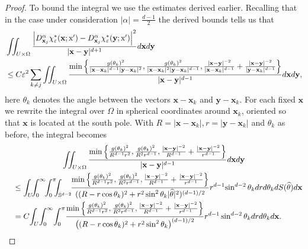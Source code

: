 \documentclass[10pt]{amsart}
\theoremstyle{definition}\newtheorem{defi}[theo]{Definition}\newtheorem{rema}[theo]{Remark}\newtheorem{exam}[theo]{Example}\newtheorem{exem}[theo]{Example}\newtheorem{nota}[theo]{Notation}
\newcommand*\eps{\varepsilon}
\renewcommand*\S {\mathbb{S}}
\newcommand\1{{\ensuremath {\mathds 1} }}
\newcommand{\bx}{\mathbf{x}}
\newcommand{\by}{\mathbf{y}}
\newcommand{\sx}{\textup{x}}
\renewcommand*{\hat}[1]{\mathchoice{\widehat{#1}}{\widehat{#1}}{\oldhat{#1}}{\oldhat{#1}}}\let\oldforall\forall
\renewcommand*{\forall}{\mathrel{\oldforall}}
\begin{document}
\begin{proof}
To bound the integral we use the estimates derived earlier. Recalling that in the case under consideration $|\alpha|= \frac{d-1}{2}$ the derived bounds tells us that
\begin{align*}
&\iint_{U\times \Omega}\frac{\left|D_{\bx_j}^\alpha\chi_\eps^*(\bx; \sx')-D_{\bx_j}^\alpha\chi_\eps^*(\by; \sx')\right|^2}{|\bx-\by|^{d+1}}d\bx d\by\\
&\leq C \eps^2\sum_{k\neq j}
\iint_{U\times \Omega}
\frac{\min\left\{
\frac{g(\theta_k)^{2}}{|\bx-\bx_k|^{d-1}|\by-\bx_k|^{2}},
\frac{g(\theta_k)^{2}}{|\bx-\bx_k|^{2}|\by-\bx_k|^{d-1}},
\frac{|\bx-\by|^{-2}}{|\bx-\bx_k|^{d-1}} +\frac{|\bx-\by|^{-2}}{|\by-\bx_k|^{d-1}}\right\}}{|\bx-\by|^{d-1}}d\bx d\by,
\end{align*}
here $\theta_k$ denotes the angle between the vectors $\bx-\bx_k$ and $\by-\bx_k$. For each fixed $\bx$ we rewrite the integral over $\Omega$ in spherical coordinates around $\bx_k$, oriented so that $\bx$ is located at the south pole. With $R=|\bx-\bx_k|, r=|\by-\bx_k|$ and $\theta_k$ as before, the integral becomes
\begin{multline*}
\iint_{U\times\Omega}\frac{\min\left\{
\frac{g(\theta_k)^{2}}{R^{d-1}r^{2}},
\frac{g(\theta_k)^{2}}{R^{2}r^{d-1}},
\frac{|\bx-\by|^{-2}}{R^{d-1}}+
\frac{|\bx-\by|^{-2}}{r^{d-1}}\right\}}{|\bx-\by|^{d-1}}d\bx d\by\\
\begin{aligned}
&\quad\leq
\int_U\!\!\int_0^{\infty}\!\!\int_0^\pi\!\!\!\int_{\S^{d-2}}
\!\!\frac{
\min\left\{
\frac{g(\theta_k)^{2}}{R^{d-1}r^{2}},
\frac{g(\theta_k)^{2}}{R^{2}r^{d-1}},
\frac{|\bx-\by|^{-2}}{R^{d-1}} +\frac{|\bx-\by|^{-2}}{r^{d-1}}
\right\}} {((R-r \cos\theta_k)^2+r^2\sin^2 \theta_k |\hat\theta|^2)^{(d-1)/2}} r^{d-1}\!\sin^{d-2}\theta_k dr d\theta_k d S(\hat\theta) d\bx\\
&\quad= C\!\int_U\!\int_0^{\infty}\!\int_0^\pi\!
\frac{
\min\left\{
\frac{g(\theta_k)^{2}}{R^{d-1}r^{2}},
\frac{g(\theta_k)^{2}}{R^{2}r^{d-1}},
\frac{|\bx-\by|^{-2}}{R^{d-1}}+
\frac{|\bx-\by|^{-2}}{r^{d-1}}
\right\}} {\left((R-r \cos\theta_k)^2+r^2\sin^2 \theta_k\right)^{(d-1)/2}} r^{d-1}\sin^{d-2}\theta_k dr d\theta_k d\bx.
\end{aligned}
\end{multline*}


\end{proof}
\end{document}
